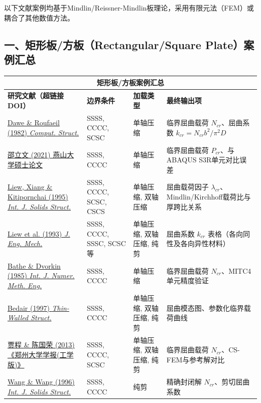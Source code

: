 \documentclass[12pt,a4paper]{article}
\begin{document}
以下文献案例均基于Mindlin/Reissner-Mindlin板理论，采用有限元法（FEM）或耦合了其他数值方法。

\subsection*{一、矩形板/方板（Rectangular/Square Plate）案例汇总}

{\small
\setlength{\tabcolsep}{3.5pt}
\begin{longtable}{|p{5.2cm}|p{1.8cm}|p{2.0cm}|p{5.2cm}|}
\hline
\multicolumn{4}{|c|}{矩形板/方板案例汇总} \\
\hline
\textbf{研究文献（超链接DOI）} & \textbf{边界条件} & \textbf{加载类型} & \textbf{最终输出项} \\
\hline
\endhead
\href{https://doi.org/10.1016/0045-7949(82)90081-5}{Dawe \& Roufaeil (1982) \emph{Comput. Struct.}} & SSSS, CCCC, SCSC & 单轴压缩 & 临界屈曲载荷 $N_{cr}$、屈曲系数 $k_{cr}=N_{cr}b^2/\pi^2D$ \\
\hline
\href{https://www.cnki.net/}{邵立文 (2021) 燕山大学硕士论文} & SSSS, CCCC & 单轴压缩 & 临界屈曲载荷 $P_{cr}$、与ABAQUS S3R单元对比误差 \\
\hline
\href{https://doi.org/10.1016/0020-7683(95)00123-9}{Liew, Xiang \& Kitipornchai (1995) \emph{Int. J. Solids Struct.}} & SSSS, CCCC, SCSC, CSCS & 单轴压缩, 双轴压缩 & 屈曲载荷因子 $\lambda_{cr}$、Mindlin/Kirchhoff载荷比与厚跨比关系 \\
\hline
\href{https://doi.org/10.1061/(ASCE)0733-9399(1993)119:4(718)}{Liew et al. (1993) \emph{J. Eng. Mech.}} & SSSS, CCCC, SSSC, SCSC等 & 单轴压缩, 双轴压缩, 纯剪 & 屈曲系数 $k_{cr}$ 表格（各向同性及各向异性材料） \\
\hline
\href{https://doi.org/10.1002/nme.1620210212}{Bathe \& Dvorkin (1985) \emph{Int. J. Numer. Meth. Eng.}} & SSSS, CCCC & 单轴压缩 & 临界屈曲载荷 $N_{cr}$、MITC4单元精度验证 \\
\hline
\href{https://doi.org/10.1016/S0263-8231(97)00013-X}{Bedair (1997) \emph{Thin-Walled Struct.}} & SSSS, CCCC & 单轴压缩, 双轴压缩, 纯剪 & 屈曲模态图、参数化临界载荷曲线 \\
\hline
\href{https://www.cnki.net/}{贾程 \& 陈国荣 (2013) 《郑州大学学报(工学版)》} & SSSS, CCCC, SCSC & 单轴压缩, 双轴压缩, 纯剪 & 临界屈曲载荷 $N_{cr}$、CS-FEM与参考解对比 \\
\hline
\href{https://doi.org/10.1016/0020-7683(95)00123-9}{Wang \& Wang (1996) \emph{Int. J. Solids Struct.}} & SSSS, CCCC & 纯剪 & 精确封闭解 $N_{cr}$、剪切屈曲系数 \\

\end{longtable}}
\end{document}
